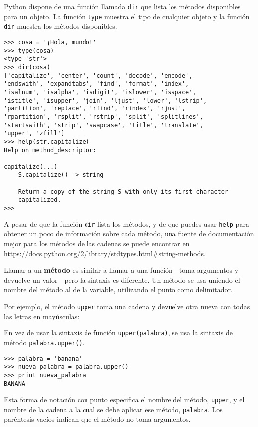 Python dispone de una función llamada {\tt dir} que lista los métodos disponibles
para un objeto. La función {\tt type} muestra el tipo de cualquier objeto
y la función {\tt dir} muestra los métodos disponibles. 

\beforeverb
\begin{verbatim}
>>> cosa = '¡Hola, mundo!'
>>> type(cosa)
<type 'str'>
>>> dir(cosa)
['capitalize', 'center', 'count', 'decode', 'encode', 
'endswith', 'expandtabs', 'find', 'format', 'index', 
'isalnum', 'isalpha', 'isdigit', 'islower', 'isspace', 
'istitle', 'isupper', 'join', 'ljust', 'lower', 'lstrip', 
'partition', 'replace', 'rfind', 'rindex', 'rjust', 
'rpartition', 'rsplit', 'rstrip', 'split', 'splitlines', 
'startswith', 'strip', 'swapcase', 'title', 'translate', 
'upper', 'zfill']
>>> help(str.capitalize)
Help on method_descriptor:

capitalize(...)
    S.capitalize() -> string
    
    Return a copy of the string S with only its first character
    capitalized.
>>>
\end{verbatim}
\afterverb
%

A pesar de que la función {\tt dir} lista los métodos, y de que
puedes usar {\tt help} para obtener un poco de información sobre
cada método, una fuente de documentación mejor para los métodos de las cadenas
se puede encontrar en
\url{https://docs.python.org/2/library/stdtypes.html#string-methods}.

Llamar a un {\bf método} es similar a llamar a una función---toma
argumentos y devuelve un valor---pero la sintaxis es diferente.
Un método se usa uniendo el nombre del método al de la variable,
utilizando el punto como delimitador.

Por ejemplo, el
método {\tt upper} toma una cadena y devuelve otra nueva con todas
las letras en mayúsculas:


En vez de usar la sintaxis de función {\tt upper(palabra)}, se usa
la sintaxis de método {\tt palabra.upper()}.


\beforeverb
\begin{verbatim}
>>> palabra = 'banana'
>>> nueva_palabra = palabra.upper()
>>> print nueva_palabra
BANANA
\end{verbatim}
\afterverb
%
Esta forma de notación con punto especifica el nombre del método,
{\tt upper}, y el nombre de la cadena a la cual se debe aplicar ese método,
{\tt palabra}. Los paréntesis vacíos indican que el método no toma
argumentos.


